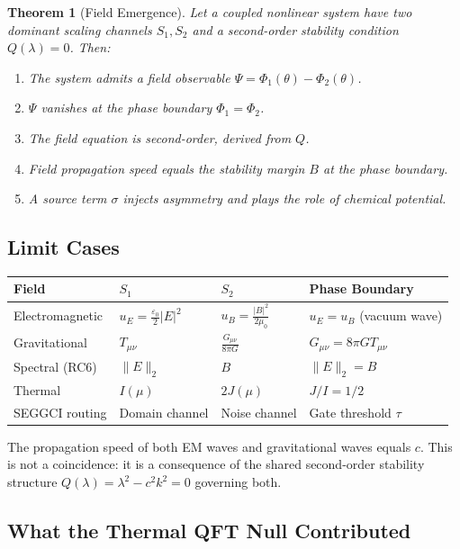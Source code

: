\documentclass[11pt]{article}
\newtheorem{theorem}{Theorem}
\begin{document}
\begin{theorem}[Field Emergence]
Let a coupled nonlinear system have two dominant scaling channels $S_1, S_2$ and a second-order stability condition $Q(\lambda) = 0$. Then:
\begin{enumerate}
  \item The system admits a field observable $\Psi = \Phi_1(\theta) - \Phi_2(\theta)$.
  \item $\Psi$ vanishes at the phase boundary $\Phi_1 = \Phi_2$.
  \item The field equation is second-order, derived from $Q$.
  \item Field propagation speed equals the stability margin $B$ at the phase boundary.
  \item A source term $\sigma$ injects asymmetry and plays the role of chemical potential.
\end{enumerate}
\end{theorem}

\subsection{Limit Cases}

\begin{longtable}{llll}
\toprule
\textbf{Field} & \textbf{$S_1$} & \textbf{$S_2$} & \textbf{Phase Boundary} \\
\midrule
Electromagnetic & $u_E = \frac{\varepsilon_0}{2}|E|^2$ & $u_B = \frac{|B|^2}{2\mu_0}$ & $u_E = u_B$ (vacuum wave) \\
Gravitational & $T_{\mu\nu}$ & $\frac{G_{\mu\nu}}{8\pi G}$ & $G_{\mu\nu} = 8\pi G T_{\mu\nu}$ \\
Spectral (RC6) & $\|E\|_2$ & $B$ & $\|E\|_2 = B$ \\
Thermal & $I(\mu)$ & $2J(\mu)$ & $J/I = 1/2$ \\
SEGGCI routing & Domain channel & Noise channel & Gate threshold $\tau$ \\
\bottomrule
\end{longtable}

The propagation speed of both EM waves and gravitational waves equals $c$. This is not a coincidence: it is a consequence of the shared second-order stability structure $Q(\lambda) = \lambda^2 - c^2k^2 = 0$ governing both.

\subsection{What the Thermal QFT Null Contributed}
\end{document}
